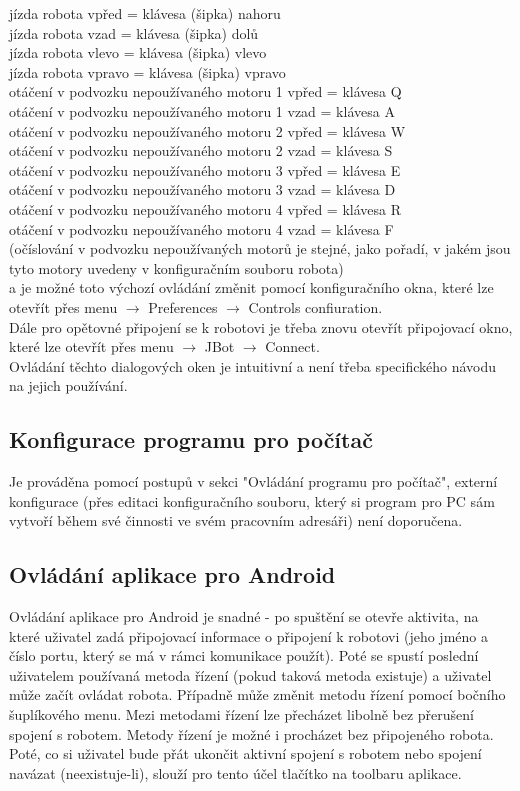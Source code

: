 \documentclass[12pt, ngerman]{article}
\begin{document}
jízda robota vpřed = klávesa (šipka) nahoru\\
jízda robota vzad = klávesa (šipka) dolů\\
jízda robota vlevo = klávesa (šipka) vlevo\\
jízda robota vpravo = klávesa (šipka) vpravo \\
otáčení v podvozku nepoužívaného motoru 1 vpřed = klávesa Q\\
otáčení v podvozku nepoužívaného motoru 1 vzad = klávesa A\\
otáčení v podvozku nepoužívaného motoru 2 vpřed = klávesa W\\
otáčení v podvozku nepoužívaného motoru 2 vzad = klávesa S\\
otáčení v podvozku nepoužívaného motoru 3 vpřed = klávesa E\\
otáčení v podvozku nepoužívaného motoru 3 vzad = klávesa D\\
otáčení v podvozku nepoužívaného motoru 4 vpřed = klávesa R\\
otáčení v podvozku nepoužívaného motoru 4 vzad = klávesa F\\
(očíslování v podvozku nepoužívaných motorů je stejné, jako pořadí, v jakém jsou tyto motory uvedeny v konfiguračním souboru robota)\\

a je možné toto výchozí ovládání změnit pomocí konfiguračního okna, které lze otevřít přes menu $\rightarrow$ Preferences $\rightarrow$ Controls confiuration.\\
Dále pro opětovné připojení se k robotovi je třeba znovu otevřít připojovací okno, které lze otevřít přes menu $\rightarrow$ JBot $\rightarrow$ Connect.\\
Ovládání těchto dialogových oken je intuitivní a není třeba specifického návodu na jejich používání.

\subsection{Konfigurace programu pro počítač}
Je prováděna pomocí postupů v sekci "Ovládání programu pro počítač", externí konfigurace (přes editaci konfiguračního souboru, který si program pro PC sám vytvoří během své činnosti ve svém pracovním adresáři) není doporučena.

\subsection{Ovládání aplikace pro Android}
Ovládání aplikace pro Android je snadné - po spuštění se otevře aktivita, na které uživatel zadá připojovací informace o připojení k robotovi (jeho jméno a číslo portu, který se má v rámci komunikace použít). Poté se spustí poslední uživatelem používaná metoda řízení (pokud taková metoda existuje) a uživatel může začít ovládat robota. Případně může změnit metodu řízení pomocí bočního šuplíkového menu. Mezi metodami řízení lze přecházet libolně bez přerušení spojení s robotem. Metody řízení je možné i procházet bez připojeného robota. Poté, co si uživatel bude přát ukončit aktivní spojení s robotem nebo spojení navázat (neexistuje-li), slouží pro tento účel tlačítko na toolbaru aplikace.
\end{document}
